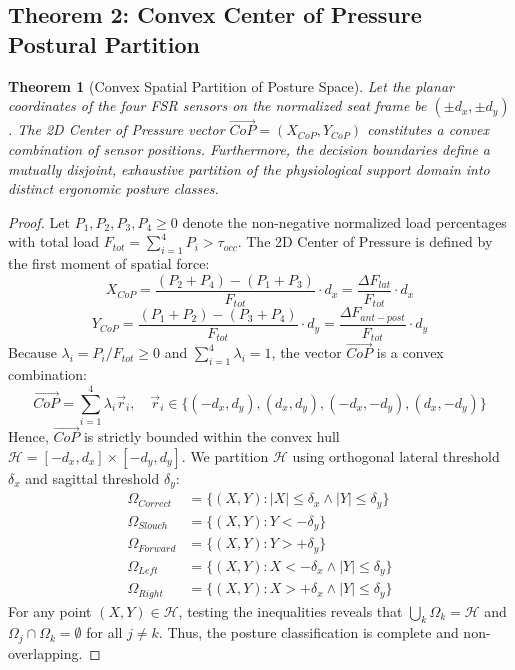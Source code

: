 \documentclass[conference]{IEEEtran}
\newtheorem{theorem}{Theorem}
\begin{document}
\subsection{Theorem 2: Convex Center of Pressure Postural Partition}
\begin{theorem}[Convex Spatial Partition of Posture Space]
Let the planar coordinates of the four FSR sensors on the normalized seat frame be $(\pm d_x, \pm d_y)$. The 2D Center of Pressure vector $\vec{CoP} = (X_{CoP}, Y_{CoP})$ constitutes a convex combination of sensor positions. Furthermore, the decision boundaries define a mutually disjoint, exhaustive partition of the physiological support domain into distinct ergonomic posture classes.
\end{theorem}

\begin{proof}
Let $P_1, P_2, P_3, P_4 \ge 0$ denote the non-negative normalized load percentages with total load $F_{tot} = \sum_{i=1}^4 P_i > \tau_{occ}$. The 2D Center of Pressure is defined by the first moment of spatial force:
\begin{equation}
X_{CoP} = \frac{(P_2 + P_4) - (P_1 + P_3)}{F_{tot}} \cdot d_x = \frac{\Delta F_{lat}}{F_{tot}} \cdot d_x
\label{eq:xcop}
\end{equation}
\begin{equation}
Y_{CoP} = \frac{(P_1 + P_2) - (P_3 + P_4)}{F_{tot}} \cdot d_y = \frac{\Delta F_{ant-post}}{F_{tot}} \cdot d_y
\label{eq:ycop}
\end{equation}
Because $\lambda_i = P_i / F_{tot} \ge 0$ and $\sum_{i=1}^4 \lambda_i = 1$, the vector $\vec{CoP}$ is a convex combination:
\begin{equation}
\vec{CoP} = \sum_{i=1}^4 \lambda_i \vec{r}_i, \quad \vec{r}_i \in \{(-d_x, d_y), (d_x, d_y), (-d_x, -d_y), (d_x, -d_y)\}
\label{eq:convex_comb}
\end{equation}
Hence, $\vec{CoP}$ is strictly bounded within the convex hull $\mathcal{H} = [-d_x, d_x] \times [-d_y, d_y]$. We partition $\mathcal{H}$ using orthogonal lateral threshold $\delta_x$ and sagittal threshold $\delta_y$:
\begin{equation}
\begin{aligned}
  \Omega_{Correct} &= \{(X, Y) : |X| \le \delta_x \land |Y| \le \delta_y\} \\
  \Omega_{Slouch} &= \{(X, Y) : Y < -\delta_y\} \\
  \Omega_{Forward} &= \{(X, Y) : Y > +\delta_y\} \\
  \Omega_{Left} &= \{(X, Y) : X < -\delta_x \land |Y| \le \delta_y\} \\
  \Omega_{Right} &= \{(X, Y) : X > +\delta_x \land |Y| \le \delta_y\}
\end{aligned}
\label{eq:regions}
\end{equation}
For any point $(X, Y) \in \mathcal{H}$, testing the inequalities reveals that $\bigcup_k \Omega_k = \mathcal{H}$ and $\Omega_j \cap \Omega_k = \emptyset$ for all $j \ne k$. Thus, the posture classification is complete and non-overlapping.


\end{proof}
\end{document}
